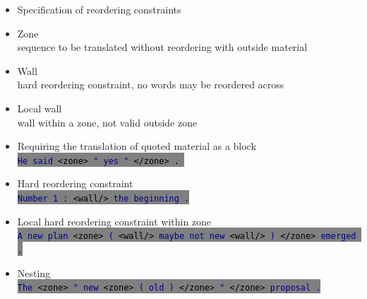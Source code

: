 \documentclass[landscape]{uedslides2C}
\newcommand{\example}[1]{\textcolor{darkblue}{\rm #1}}
\newcommand{\littlecode}[1]{\colorbox{gray}{\textcolor{black}{\small \tt #1}}}
\begin{document}

\vspace{10mm}
\begin{itemize}
\item Specification of reordering constraints
\item Zone\\[2mm] sequence to be translated without reordering with outside material
\item Wall\\[2mm] hard reordering constraint, no words may be reordered across
\item Local wall\\[2mm] wall within a zone, not valid outside zone
\end{itemize}


\vspace{10mm}
\begin{itemize}
\item Requiring the translation of quoted material as a block\\
\littlecode{\example{He said} <zone> \example{" yes "} </zone> . }
\item Hard reordering constraint\\
\littlecode{\example{Number 1 : }<wall/> \example{the beginning .}}
\item Local hard reordering constraint within zone\\
\littlecode{\example{A new plan} <zone> \example{(} <wall/> \example{maybe not new} <wall/> \example{)} </zone> \example{emerged .}}
\item Nesting\\
\littlecode{\example{The} <zone> \example{" new} <zone> \example{( old )} </zone> \example{"} </zone> \example{proposal .}}
\end{itemize}

\end{document}
